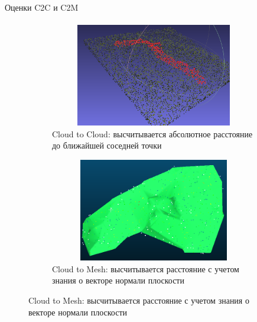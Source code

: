 \begin{frame}[t]{Оценки C2C и C2M}
\framesubtitle{}
    \begin{figure}[H]
        \begin{subfigure}[t]{0.49\textwidth}
            \centering\includegraphics[height=4.5cm,width=1\textwidth,keepaspectratio]{../images/slides/c2c.png}
            \caption*{Cloud to Cloud: высчитывается абсолютное расстояние до ближайшей соседней точки}
        \end{subfigure}
        \begin{subfigure}[t]{0.49\textwidth}
            \centering\includegraphics[height=4.5cm,width=1\textwidth,keepaspectratio]{../images/slides/c2m.png}
            \caption*{Cloud to Mesh: высчитывается расстояние с учетом знания о векторе нормали плоскости}
        \end{subfigure}
    \end{figure}
\end{frame}


